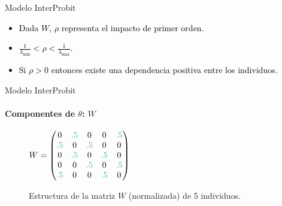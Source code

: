\begin{frame}[t]{Modelo InterProbit}
\begin{itemize}
\item \textcolor{black}{Dada $W$, $\rho$ representa el impacto de primer orden.}
\item \textcolor{black}{$\frac{1}{\lambda_{\min}} < \rho < \frac{1}{\lambda_{\max}}.$}
\item \textcolor{black}{Si $\rho > 0 $ entonces existe una dependencia positiva entre los individuos.}
\end{itemize}

\end{frame}

\setwatermark{\fontsize{90pt}{90pt}\selectfont{\textcolor{mint}{Inter}}}
\begin{frame}{Modelo InterProbit}
\framesubtitle{Componentes de $\theta$: $W$}

\begin{figure}[H]\def\b{\color{mint}}
\centering
\begin{minipage}[b]{.45\textwidth}
\caption{Gráfico de conexión circular del modelo.}\label{first}
\end{minipage}\hfill
\begin{minipage}[b]{.45\textwidth}
\centering
\small
\label{M}
\(
W= 
\begin{pmatrix}
0 & \b\text{.5} & 0 & 0 & \b\text{.5} \\
\b\text{.5} & 0 & \b\text{.5} & 0 & 0 \\
0 & \b\text{.5} & 0 & \b\text{.5} & 0 \\
0 & 0 & \b\text{.5} & 0 & \b\text{.5} \\
\b\text{.5} & 0 & 0 & \b\text{.5} & 0 \\
\end{pmatrix}
\)
\caption{Estructura de la matriz $W$ (normalizada) de 5 individuos.}\label{second}
\end{minipage}
\end{figure}

\end{frame}

